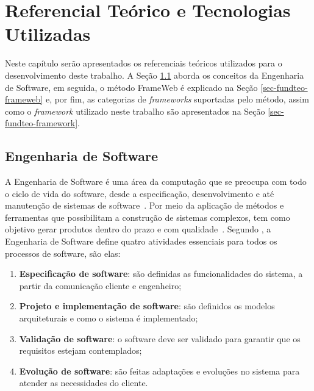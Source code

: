 \chapter{Referencial Teórico e Tecnologias Utilizadas}
\label{chap-referencial}



Neste capítulo serão apresentados os referenciais teóricos utilizados para o desenvolvimento
deste trabalho. A Seção \ref{sec-fundteo-engsoft} aborda os conceitos da Engenharia de Software,
em seguida, o método FrameWeb é explicado na Seção \ref{sec-fundteo-frameweb}
e, por fim, as categorias de \textit{frameworks} suportadas pelo método, assim como o \textit{framework}
utilizado neste trabalho são apresentados na Seção \ref{sec-fundteo-framework}.


\section{Engenharia de Software}
\label{sec-fundteo-engsoft}

A Engenharia de Software é uma área da computação que se preocupa com todo o ciclo de vida do software,
desde a especificação, desenvolvimento e até manutenção de sistemas de software~\cite{sommerville:2011}.
Por meio da aplicação de métodos e ferramentas que possibilitam a construção de sistemas complexos,
tem como objetivo gerar produtos dentro do prazo e com qualidade~\cite{pressman:2011}.
Segundo , a Engenharia de Software define quatro atividades
essenciais para todos os processos de software, são elas:


\begin{enumerate}
    \item \textbf{Especificação de software}: são definidas as funcionalidades do 
        sistema, a partir da comunicação cliente e engenheiro;
    \item \textbf{Projeto e implementação de software}: são definidos os modelos 
        arquiteturais e como o sistema é implementado;
    \item \textbf{Validação de software}: o software deve ser validado para garantir 
        que os requisitos estejam contemplados;
    \item \textbf{Evolução de software}: são feitas adaptações e evoluções no sistema 
        para atender as necessidades do cliente.
\end{enumerate}

